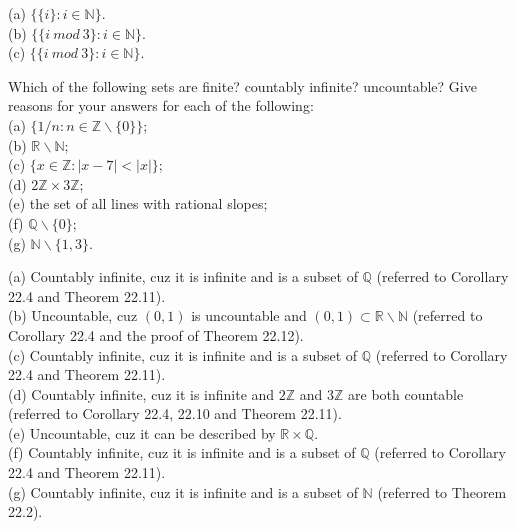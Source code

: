 \documentclass[11pt, a4paper, UTF8]{ctexart}
\begin{document}
\begin{solution}
  (a) $\{ \{ i \}: i \in \mathbb{N} \}.$\\
  (b) $\{ \{ i~mod~3\}: i \in \mathbb{N} \}.$\\
  (c) $\{ \{ i~mod~3\}: i \in \mathbb{N} \}.$
\end{solution}

\begin{problem}[UD: 22.2]
  Which of the following sets are finite? countably infinite? uncountable? 
  Give reasons for your answers for each of the following:\\
  (a) $\{ 1/n: n \in \mathbb{Z} \backslash \{ 0 \} \}$;\\
  (b) $\mathbb{R} \backslash \mathbb{N}$;\\
  (c) $\{ x \in \mathbb{Z}: |x - 7| < |x| \}$;\\
  (d) $2\mathbb{Z} \times 3\mathbb{Z}$;\\
  (e) the set of all lines with rational slopes;\\
  (f) $\mathbb{Q} \backslash \{ 0 \}$;\\
  (g) $\mathbb{N} \backslash \{ 1,3 \}$.
\end{problem}

\begin{solution}
  (a) Countably infinite, cuz it is infinite and is a subset of 
  $\mathbb{Q}$ (referred to Corollary 22.4 and Theorem 22.11).\\
  (b) Uncountable, cuz $(0, 1)$ is uncountable and $(0, 1) \subset \mathbb{R} \backslash \mathbb{N}$
   (referred to Corollary 22.4 and the proof of Theorem 22.12).\\
  (c) Countably infinite, cuz it is infinite and is a subset of 
  $\mathbb{Q}$ (referred to Corollary 22.4 and Theorem 22.11).\\
  (d) Countably infinite, cuz it is infinite and $2\mathbb{Z}$ and 
  $3\mathbb{Z}$ are both countable (referred to Corollary 22.4, 22.10 
  and Theorem 22.11).\\
  (e) Uncountable, cuz it can be described by $\mathbb{R} \times \mathbb{Q}$.\\
  (f) Countably infinite, cuz it is infinite and is a subset of 
  $\mathbb{Q}$ (referred to Corollary 22.4 and Theorem 22.11).\\
  (g) Countably infinite, cuz it is infinite and is a subset of 
  $\mathbb{N}$ (referred to Theorem 22.2).\\
\end{solution}
\end{document}
